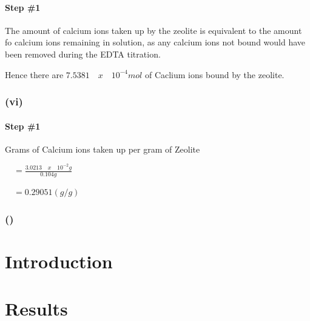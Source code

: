 \documentclass[]{article}
\let\oldparagraph\paragraph
\renewcommand{\paragraph}[1]{\oldparagraph{#1}\mbox{}}
\begin{document}
\hypertarget{step-1-6}{%
\paragraph{Step \#1}\label{step-1-6}}

The amount of calcium ions taken up by the zeolite is equivalent to the
amount fo calcium ions remaining in solution, as any calcium ions not
bound would have been removed during the EDTA titration.

Hence there are \(7.5381 \quad x \quad 10^{-4}mol\) of Caclium ions
bound by the zeolite.

\hypertarget{vi}{%
\subsubsection{(vi)}\label{vi}}

\hypertarget{step-1-7}{%
\paragraph{Step \#1}\label{step-1-7}}

Grams of Calcium ions taken up per gram of Zeolite

\(\quad = \frac{3.0213 \quad x \quad 10^{-2}g}{0.104g}\)

\(\quad = 0.29051 (g/g)\)

\hypertarget{section}{%
\subsubsection{()}\label{section}}

\hypertarget{introduction}{%
\section{Introduction}\label{introduction}}

\hypertarget{results}{%
\section{Results}\label{results}}
\end{document}
